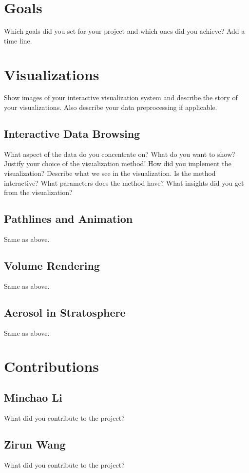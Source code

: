 \documentclass[10pt,twocolumn]{article}
\begin{document}
\section{Goals}
Which goals did you set for your project and which ones did you achieve? Add a time line.

\section{Visualizations}
Show images of your interactive visualization system and describe the story of your visualizations.
Also describe your data preprocessing if applicable.

\subsection{Interactive Data Browsing}
What aspect of the data do you concentrate on? What do you want to show? Justify your choice of the visualization method! How did you implement the visualization? Describe what we see in the visualization. Is the method interactive? What parameters does the method have? What insights did you get from the visualization?

\subsection{Pathlines and Animation}
Same as above.

\subsection{Volume Rendering}
Same as above.

\subsection{Aerosol in Stratosphere}
Same as above.

\section{Contributions}

\subsection{Minchao Li}
What did you contribute to the project?

\subsection{Zirun Wang}
What did you contribute to the project?
\end{document}
